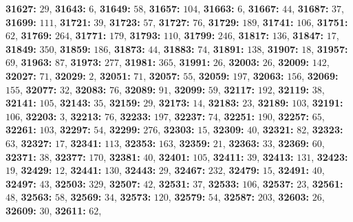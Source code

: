 \textsf{\bfseries 31627:} $29$, \textsf{\bfseries 31643:} $6$, \textsf{\bfseries 31649:} $58$, \textsf{\bfseries 31657:} $104$, \textsf{\bfseries 31663:} $6$, \textsf{\bfseries 31667:} $44$, \textsf{\bfseries 31687:} $37$, \textsf{\bfseries 31699:} $111$, \textsf{\bfseries 31721:} $39$, \textsf{\bfseries 31723:} $57$, \textsf{\bfseries 31727:} $76$, \textsf{\bfseries 31729:} $189$, \textsf{\bfseries 31741:} $106$, \textsf{\bfseries 31751:} $62$, \textsf{\bfseries 31769:} $264$, \textsf{\bfseries 31771:} $179$, \textsf{\bfseries 31793:} $110$, \textsf{\bfseries 31799:} $246$, \textsf{\bfseries 31817:} $136$, \textsf{\bfseries 31847:} $17$, \textsf{\bfseries 31849:} $350$, \textsf{\bfseries 31859:} $186$, \textsf{\bfseries 31873:} $44$, \textsf{\bfseries 31883:} $74$, \textsf{\bfseries 31891:} $138$, \textsf{\bfseries 31907:} $18$, \textsf{\bfseries 31957:} $69$, \textsf{\bfseries 31963:} $87$, \textsf{\bfseries 31973:} $277$, \textsf{\bfseries 31981:} $365$, \textsf{\bfseries 31991:} $26$, \textsf{\bfseries 32003:} $26$, \textsf{\bfseries 32009:} $142$, \textsf{\bfseries 32027:} $71$, \textsf{\bfseries 32029:} $2$, \textsf{\bfseries 32051:} $71$, \textsf{\bfseries 32057:} $55$, \textsf{\bfseries 32059:} $197$, \textsf{\bfseries 32063:} $156$, \textsf{\bfseries 32069:} $155$, \textsf{\bfseries 32077:} $32$, \textsf{\bfseries 32083:} $76$, \textsf{\bfseries 32089:} $91$, \textsf{\bfseries 32099:} $59$, \textsf{\bfseries 32117:} $192$, \textsf{\bfseries 32119:} $38$, \textsf{\bfseries 32141:} $105$, \textsf{\bfseries 32143:} $35$, \textsf{\bfseries 32159:} $29$, \textsf{\bfseries 32173:} $14$, \textsf{\bfseries 32183:} $23$, \textsf{\bfseries 32189:} $103$, \textsf{\bfseries 32191:} $106$, \textsf{\bfseries 32203:} $3$, \textsf{\bfseries 32213:} $76$, \textsf{\bfseries 32233:} $197$, \textsf{\bfseries 32237:} $74$, \textsf{\bfseries 32251:} $190$, \textsf{\bfseries 32257:} $65$, \textsf{\bfseries 32261:} $103$, \textsf{\bfseries 32297:} $54$, \textsf{\bfseries 32299:} $276$, \textsf{\bfseries 32303:} $15$, \textsf{\bfseries 32309:} $40$, \textsf{\bfseries 32321:} $82$, \textsf{\bfseries 32323:} $63$, \textsf{\bfseries 32327:} $17$, \textsf{\bfseries 32341:} $113$, \textsf{\bfseries 32353:} $163$, \textsf{\bfseries 32359:} $21$, \textsf{\bfseries 32363:} $33$, \textsf{\bfseries 32369:} $60$, \textsf{\bfseries 32371:} $38$, \textsf{\bfseries 32377:} $170$, \textsf{\bfseries 32381:} $40$, \textsf{\bfseries 32401:} $105$, \textsf{\bfseries 32411:} $39$, \textsf{\bfseries 32413:} $131$, \textsf{\bfseries 32423:} $19$, \textsf{\bfseries 32429:} $12$, \textsf{\bfseries 32441:} $130$, \textsf{\bfseries 32443:} $29$, \textsf{\bfseries 32467:} $232$, \textsf{\bfseries 32479:} $15$, \textsf{\bfseries 32491:} $40$, \textsf{\bfseries 32497:} $43$, \textsf{\bfseries 32503:} $329$, \textsf{\bfseries 32507:} $42$, \textsf{\bfseries 32531:} $37$, \textsf{\bfseries 32533:} $106$, \textsf{\bfseries 32537:} $23$, \textsf{\bfseries 32561:} $48$, \textsf{\bfseries 32563:} $58$, \textsf{\bfseries 32569:} $34$, \textsf{\bfseries 32573:} $120$, \textsf{\bfseries 32579:} $54$, \textsf{\bfseries 32587:} $203$, \textsf{\bfseries 32603:} $26$, \textsf{\bfseries 32609:} $30$, \textsf{\bfseries 32611:} $62$, 
